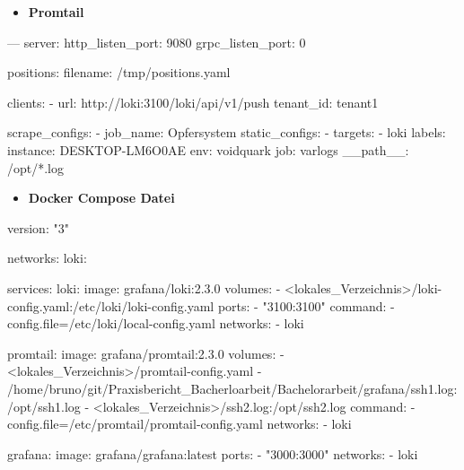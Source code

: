 \begin{itemize}[noitemsep]
    \item \textbf{Promtail} 
\end{itemize}

{
\begin{spverbatim}
    ---
    server:
      http_listen_port: 9080
      grpc_listen_port: 0
    
    positions:
      filename: /tmp/positions.yaml
    
    clients:
      - url: http://loki:3100/loki/api/v1/push
        tenant_id: tenant1
    
    scrape_configs:
    - job_name: Opfersystem
      static_configs:
      - targets:
          - loki
        labels:
          instance: DESKTOP-LM6O0AE
          env: voidquark
          job: varlogs
          __path__: /opt/*.log
\end{spverbatim}
}

\begin{itemize}[noitemsep]
    \item \textbf{Docker Compose Datei} 
\end{itemize}

{
\begin{spverbatim}
    version: "3"

    networks:
      loki:
    
    services:
      loki:
        image: grafana/loki:2.3.0
        volumes:
          - <lokales_Verzeichnis>/loki-config.yaml:/etc/loki/loki-config.yaml
        ports:
          - "3100:3100"
        command: -config.file=/etc/loki/local-config.yaml
        networks:
          - loki
    
      promtail:
        image: grafana/promtail:2.3.0
        volumes:
          - <lokales_Verzeichnis>/promtail-config.yaml
          - /home/bruno/git/Praxisbericht_Bacherloarbeit/Bachelorarbeit/grafana/ssh1.log:/opt/ssh1.log
          - <lokales_Verzeichnis>/ssh2.log:/opt/ssh2.log
        command: -config.file=/etc/promtail/promtail-config.yaml
        networks:
          - loki
    
      grafana:
        image: grafana/grafana:latest
        ports:
          - "3000:3000"
        networks:
          - loki
    
\end{spverbatim}
}